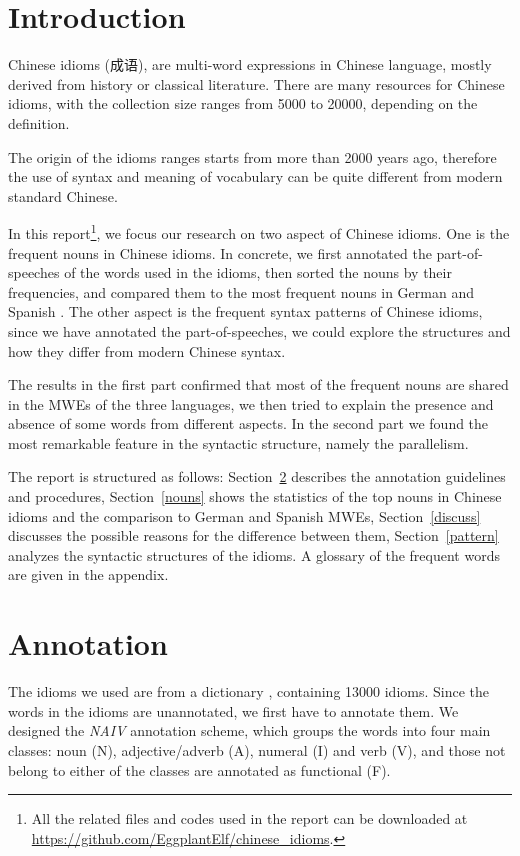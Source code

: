 \section{Introduction}
Chinese idioms (成语), are multi-word expressions in Chinese language, mostly derived from history or classical literature. There are many resources for Chinese idioms, with the collection size ranges from 5000 to 20000, depending on the definition.


The origin of the idioms ranges starts from more than 2000 years ago, therefore the use of syntax and meaning of vocabulary can be quite different from modern standard Chinese. 

In this report\footnote{All the related files and codes used in the report can be downloaded at \url{https://github.com/EggplantElf/chinese_idioms}.}, we focus our research on two aspect of Chinese idioms. 
One is the frequent nouns in Chinese idioms. In concrete, we first annotated the part-of-speeches of the words used in the idioms, then sorted the nouns by their frequencies, and compared them to the most frequent nouns in German and Spanish \citep{mahlow:2013, Duden:2008, Seco:2004}. 
The other aspect is the frequent syntax patterns of Chinese idioms, since we have annotated the part-of-speeches, we could explore the structures and how they differ from modern Chinese syntax.

The results in the first part confirmed that most of the frequent nouns are shared in the MWEs of the three languages, we then tried to explain the presence and absence of some words from different aspects.
In the second part we found the most remarkable feature in the syntactic structure, namely the parallelism. 

The report is structured as follows: Section~\ref{anno} describes the annotation guidelines and procedures, Section~\ref{nouns} shows the statistics of the top nouns in Chinese idioms and the comparison to German and Spanish MWEs, Section~\ref{discuss} discusses the possible reasons for the difference between them, Section~\ref{pattern} analyzes the syntactic structures of the idioms. A glossary of the frequent words are given in the appendix.

\section{Annotation}\label{anno}
The idioms we used are from a dictionary \citep{song:2014}, containing 13000 idioms. 
Since the words in the idioms are unannotated, we first have to annotate them. We designed the {\em NAIV} annotation scheme, which  groups the words into four main classes: noun (N), adjective/adverb (A), numeral (I) and verb (V), and those not belong to either of the classes are annotated as functional (F). 

